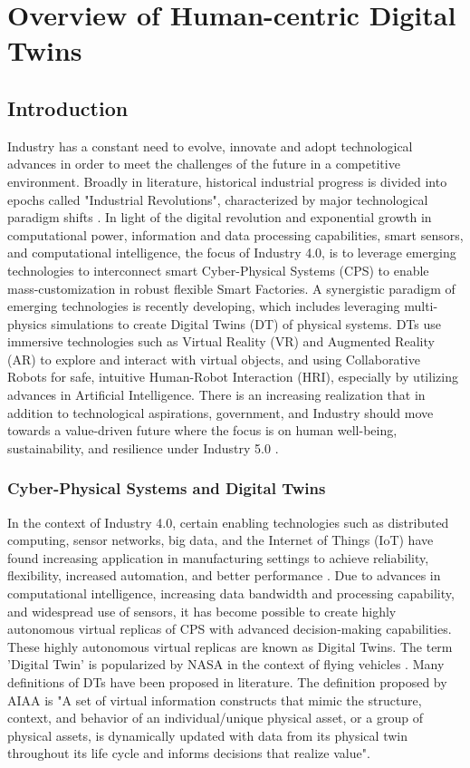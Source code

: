 \chapter{Overview of Human-centric Digital Twins}
\label{chap:literature_review}

\section{Introduction}

Industry has a constant need to evolve, innovate and adopt technological advances in order to meet the challenges of the future in a competitive environment. Broadly in literature, historical industrial progress is divided into epochs called "Industrial Revolutions", characterized by major technological paradigm shifts \cite{Nahavandi2019}. In light of the digital revolution and exponential growth in computational power, information and data processing capabilities, smart sensors, and computational intelligence, the focus of Industry 4.0, is to leverage emerging technologies to interconnect smart Cyber-Physical Systems (CPS) to enable mass-customization in robust flexible Smart Factories. A synergistic paradigm of emerging technologies is recently developing, which includes leveraging multi-physics simulations to create Digital Twins (DT) of physical systems. DTs use immersive technologies such as Virtual Reality (VR) and Augmented Reality (AR) to explore and interact with virtual objects, and using Collaborative Robots for safe, intuitive Human-Robot Interaction (HRI), especially by utilizing advances in Artificial Intelligence. There is an increasing realization that in addition to technological aspirations, government, and Industry should move towards a value-driven future where the focus is on human well-being, sustainability, and resilience under Industry 5.0 \cite{Lu-ManuOutlook}.

\subsection{Cyber-Physical Systems and Digital Twins}
In the context of Industry 4.0, certain enabling technologies such as distributed computing, sensor networks, big data, and the Internet of Things (IoT) have found increasing application in manufacturing settings to achieve reliability, flexibility, increased automation, and better performance \cite{Gallala2022}. Due to advances in computational intelligence, increasing data bandwidth and processing capability, and widespread use of sensors, it has become possible to create highly autonomous virtual replicas of CPS with advanced decision-making capabilities. These highly autonomous virtual replicas are known as Digital Twins. The term 'Digital Twin' is popularized by NASA in the context of flying vehicles \cite{shafto2012modeling}. Many definitions of DTs have been proposed in literature. The definition proposed by AIAA \cite{AIAA} is "A set of virtual information constructs that mimic the structure, context, and behavior of an individual/unique physical asset, or a group of physical assets, is dynamically updated with data from its physical twin throughout its life cycle and informs decisions that realize value".

